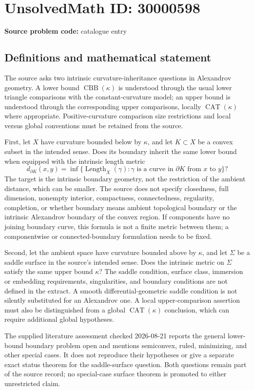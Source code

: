 \documentclass[11pt]{article}
\begin{document}
\section*{UnsolvedMath ID: 30000598}
\textbf{Source problem code:} catalogue entry
\subsection{Definitions and mathematical statement}
The source asks two intrinsic curvature-inheritance questions in Alexandrov geometry. A lower bound \(\operatorname{CBB}(\kappa)\) is understood through the usual lower triangle comparisons with the constant-curvature model; an upper bound is understood through the corresponding upper comparisons, locally \(\operatorname{CAT}(\kappa)\) where appropriate. Positive-curvature comparison size restrictions and local versus global conventions must be retained from the source.

First, let \(X\) have curvature bounded below by \(\kappa\), and let \(K\subset X\) be a convex subset in the intended sense. Does its boundary inherit the same lower bound when equipped with the intrinsic length metric
\[
d_{\partial K}(x,y)=\inf\{\operatorname{Length}_X(\gamma):\gamma\text{ is a curve in }\partial K\text{ from }x\text{ to }y\}?
\]
The target is the intrinsic boundary geometry, not the restriction of the ambient distance, which can be smaller. The source does not specify closedness, full dimension, nonempty interior, compactness, connectedness, regularity, completion, or whether boundary means ambient topological boundary or the intrinsic Alexandrov boundary of the convex region. If components have no joining boundary curve, this formula is not a finite metric between them; a componentwise or connected-boundary formulation needs to be fixed.

Second, let the ambient space have curvature bounded above by \(\kappa\), and let \(\Sigma\) be a saddle surface in the source's intended sense. Does the intrinsic metric on \(\Sigma\) satisfy the same upper bound \(\kappa\)? The saddle condition, surface class, immersion or embedding requirements, singularities, and boundary conditions are not defined in the extract. A smooth differential-geometric saddle condition is not silently substituted for an Alexandrov one. A local upper-comparison assertion must also be distinguished from a global \(\operatorname{CAT}(\kappa)\) conclusion, which can require additional global hypotheses.

The supplied literature assessment checked 2026-08-21 reports the general lower-bound boundary problem open and mentions semiconvex, ruled, minimizing, and other special cases. It does not reproduce their hypotheses or give a separate exact status theorem for the saddle-surface question. Both questions remain part of the source record; no special-case surface theorem is promoted to either unrestricted claim.
\end{document}
